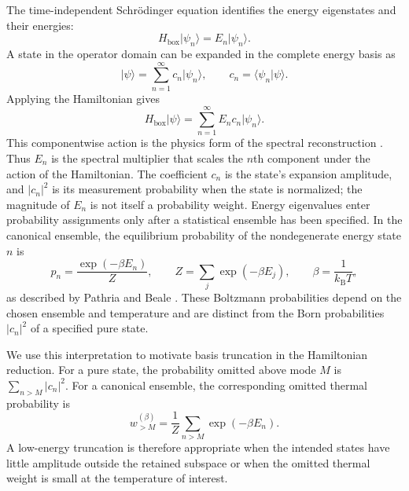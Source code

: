 \documentclass[11pt]{article}
\begin{document}
The time-independent Schr\"odinger equation identifies the energy eigenstates and
their energies:
\begin{equation}
 H_{\mathrm{box}}\lvert\psi_n\rangle
 =E_n\lvert\psi_n\rangle.
 \label{eq:tise-spectral-eigenpair}
\end{equation}
A state in the operator domain can be expanded in the complete energy basis as
\begin{equation}
 \lvert\psi\rangle=\sum_{n=1}^{\infty}c_n\lvert\psi_n\rangle,
 \qquad
 c_n=\langle\psi_n\vert\psi\rangle.
 \label{eq:state-spectral-expansion}
\end{equation}
Applying the Hamiltonian gives
\begin{equation}
 H_{\mathrm{box}}\lvert\psi\rangle
 =\sum_{n=1}^{\infty}E_n c_n\lvert\psi_n\rangle.
 \label{eq:hamiltonian-spectral-action}
\end{equation}
This componentwise action is the physics form of the spectral reconstruction
\cite{shankar1994,sakuraiNapolitano2020}. Thus $E_n$ is the spectral multiplier that scales the $n$th component under the
action of the Hamiltonian. The coefficient $c_n$ is the state's expansion amplitude,
and $\lvert c_n\rvert^2$ is its measurement probability when the state is normalized;
the magnitude of $E_n$ is not itself a probability weight. Energy eigenvalues enter
probability assignments only after a statistical ensemble has been specified. In the
canonical ensemble, the equilibrium probability of the nondegenerate energy state
$n$ is
\begin{equation}
 p_n=\frac{\exp(-\beta E_n)}{Z},
 \qquad
 Z=\sum_j\exp(-\beta E_j),
 \qquad
 \beta=\frac{1}{k_{\mathrm B}T},
 \label{eq:canonical-boltzmann-probability}
\end{equation}
as described by Pathria and Beale \cite{pathriaBeale2011}. These Boltzmann
probabilities depend on the chosen ensemble and temperature and are distinct from the
Born probabilities $\lvert c_n\rvert^2$ of a specified pure state.

We use this interpretation to motivate basis truncation in the Hamiltonian reduction.
For a pure state, the probability omitted above mode $M$ is
$\sum_{n>M}\lvert c_n\rvert^2$. For a canonical ensemble, the corresponding omitted
thermal probability is
\begin{equation}
 w_{>M}^{(\beta)}
 =\frac{1}{Z}\sum_{n>M}\exp(-\beta E_n).
 \label{eq:omitted-canonical-weight}
\end{equation}
A low-energy truncation is therefore appropriate when the intended states have little
amplitude outside the retained subspace or when the omitted thermal weight is small at
the temperature of interest.
\end{document}
